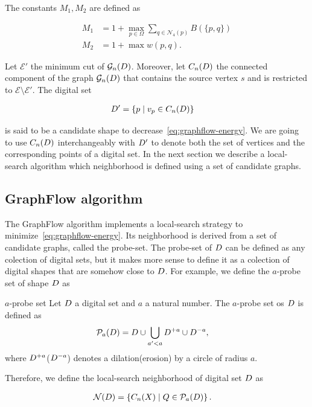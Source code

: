 The constants $M_1,M_2$ are defined as

\begin{align*}
M_1 &= 1 + \max_{p \in \Omega}{\sum_{q \in \mathcal{N}_4(p)}}{B(\{p,q\})} \\
M_2 &= 1 + \max w(p,q).
\end{align*}


Let $\mathcal{E}'$ the minimum cut of $\mathcal{G}_n(D)$. Moreover, let $C_n(D)$ the connected component of the graph $\mathcal{G}_n(D)$ that contains the source vertex $s$ and is restricted to $\mathcal{E} \setminus \mathcal{E}'$. The digital set 

\begin{align*}
	D' &= \{ p \; | \; v_p \in C_n(D) \}
\end{align*}

is said to be a candidate shape to decrease~\cref{eq:graphflow-energy}. We are going to use $C_n(D)$ interchangeably with $D'$ to denote both the set of vertices and the corresponding points of a digital set. In the next section we describe a local-search algorithm which neighborhood is defined using a set of candidate graphs.
 

\subsection{GraphFlow algorithm}
	The GraphFlow algorithm implements a local-search strategy to minimize~\cref{eq:graphflow-energy}. Its neighborhood is derived from a set of candidate graphs, called the probe-set. 	
	The probe-set of $D$ can be defined as any colection of digital sets, but it makes more sense to define it as a colection of digital shapes that are somehow close to $D$. For example, we define the $a$-probe set of shape $D$ as

\begin{definition}{$a$-probe set}
	Let $D$ a digital set and $a$ a natural number. The $a$-probe set os $D$ is defined as
	\begin{align*}
		\mathcal{P}_a(D) &= D \cup \bigcup_{a' < a}{D^{+a} \cup D^{-a}},
	\end{align*}
	where $D^{+a}$($D^{-a}$) denotes a dilation(erosion) by a circle of radius $a$.
\end{definition}

Therefore, we define the local-search neighborhood of digital set $D$ as

\begin{align*}
	\mathcal{N}(D) &= \left \{ C_n(X) \; | \; Q \in \mathcal{P}_a(D) \right\}.
\end{align*}

